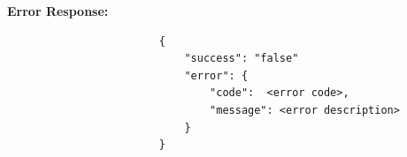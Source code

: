 \documentclass[12pt]{article}
\begin{document}
        \par\textbf{Error Response:}
                    \begin{listing}[H]
                    \begin{verbatim}
                        {     
                            "success": "false"
                            "error": {
                                "code":  <error code>,
                                "message": <error description>
                            }
                        }
                    \end{verbatim}
                    \end{listing}
\end{document}

